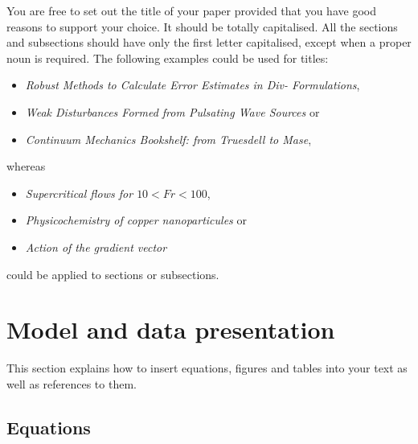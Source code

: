 \documentclass[date]{ppgem}
\begin{document}
\begin{multicols}{2}
You are free to set out the title of your paper provided that you have good reasons to support your choice. It should be totally capitalised. All the sections and subsections should have only the first letter capitalised, except when a proper noun is required. The following examples could be used for titles:
\begin{itemize}
\item  \emph{Robust Methods to Calculate Error Estimates in Div- Formulations}, \\
\item  \emph{Weak Disturbances Formed from Pulsating Wave Sources} or \\
\item  \emph{Continuum Mechanics Bookshelf: from Truesdell to Mase}, 
\end{itemize}
whereas
\begin{itemize}
\item  \emph{Supercritical flows for $ 10 < Fr < 100 $}, \\
\item  \emph{Physicochemistry of copper nanoparticules} or  \\
\item  \emph{Action of the gradient vector} 
\end{itemize}
could be applied to sections or subsections. 

\section{Model and data presentation}

This section explains how to insert equations, figures and tables into your text as well as references to them.

\subsection{Equations \label{subsec:eqs}}


\end{multicols}
\end{document}
